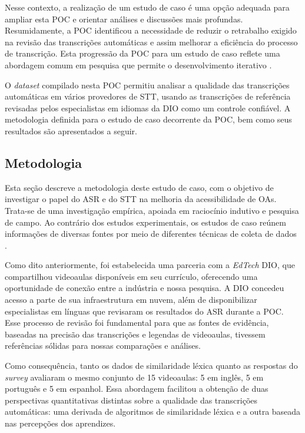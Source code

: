 Nesse contexto, a realização de um estudo de caso é uma opção adequada para ampliar esta POC e orientar análises e discussões mais profundas. Resumidamente, a POC identificou a necessidade de reduzir o retrabalho exigido na revisão das transcrições automáticas e assim melhorar a eficiência do processo de transcrição. Esta progressão da POC para um estudo de caso reflete uma abordagem comum em pesquisa que permite o desenvolvimento iterativo \cite{Runeson2009}. 

O \textit{dataset} compilado nesta POC permitiu analisar a qualidade das transcrições automáticas em vários provedores de STT, usando as transcrições de referência revisadas pelos especialistas em idiomas da DIO como um controle confiável. A metodologia definida para o estudo de caso decorrente da POC, bem como seus resultados são apresentados a seguir.

\subsection{Metodologia}

Esta seção descreve a metodologia deste estudo de caso, com o objetivo de investigar o papel do ASR e do STT na melhoria da acessibilidade de OAs. Trata-se de uma investigação empírica, apoiada em raciocínio indutivo e pesquisa de campo. Ao contrário dos estudos experimentais, os estudos de caso reúnem informações de diversas fontes por meio de diferentes técnicas de coleta de dados \cite{Sommerville2015}.

Como dito anteriormente, foi estabelecida uma parceria com a \textit{EdTech} DIO, que compartilhou videoaulas disponíveis em seu currículo, oferecendo uma oportunidade de conexão entre a indústria e nossa pesquisa. A DIO concedeu acesso a parte de sua infraestrutura em nuvem, além de disponibilizar especialistas em línguas que revisaram os resultados do ASR durante a POC. Esse processo de revisão foi fundamental para que as fontes de evidência, baseadas na precisão das transcrições e legendas de videoaulas, tivessem referências sólidas para nossas comparações e análises.

Como consequência, tanto os dados de similaridade léxica quanto as respostas do \textit{survey} avaliaram o mesmo conjunto de 15 videoaulas: 5 em inglês, 5 em português e 5 em espanhol. Essa abordagem facilitou a obtenção de duas perspectivas quantitativas distintas sobre a qualidade das transcrições automáticas: uma derivada de algoritmos de similaridade léxica e a outra baseada nas percepções dos aprendizes.

